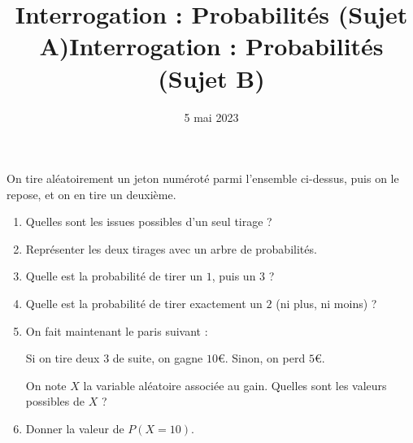 \documentclass[
	classe=$1^{ere}STI2D$,
	landscape,
	twocolumn,
]{évaluation}
\date{5 mai 2023}
\begin{document}
\title{Interrogation : Probabilités (Sujet A)}
\maketitle

\begin{center}
\end{center}
On tire aléatoirement un jeton numéroté parmi l'ensemble ci-dessus, puis on le repose, et on en tire un deuxième.
\begin{enumerate}
	\item Quelles sont les issues possibles d'un seul tirage ?
	\item Représenter les deux tirages avec un arbre de probabilités.
	\item Quelle est la probabilité de tirer un $1$, puis un $3$ ?
	\item Quelle est la probabilité de tirer exactement un $2$ (ni plus, ni moins) ?
	\item On fait maintenant le paris suivant :

	      Si on tire deux $3$ de suite, on gagne $10$€. Sinon, on perd $5$€.

	      On note $X$ la variable aléatoire associée au gain. Quelles sont les valeurs possibles de $X$ ?
	\item Donner la valeur de $P(X = 10)$.
\end{enumerate}


\newpage

\title{Interrogation : Probabilités (Sujet B)}
\maketitle
\end{document}

